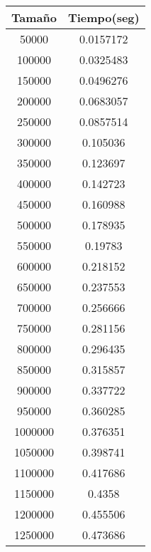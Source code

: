 \begin{longtable}{|c|c|}
\hline
\textbf{Tamaño}  & \textbf{Tiempo(seg)} \\ \hline
50000   & 0.0157172   \\ \hline
100000  & 0.0325483   \\ \hline
150000  & 0.0496276   \\ \hline
200000  & 0.0683057   \\ \hline
250000  & 0.0857514   \\ \hline
300000  & 0.105036    \\ \hline
350000  & 0.123697    \\ \hline
400000  & 0.142723    \\ \hline
450000  & 0.160988    \\ \hline
500000  & 0.178935    \\ \hline
550000  & 0.19783     \\ \hline
600000  & 0.218152    \\ \hline
650000  & 0.237553    \\ \hline
700000  & 0.256666    \\ \hline
750000  & 0.281156    \\ \hline
800000  & 0.296435    \\ \hline
850000  & 0.315857    \\ \hline
900000  & 0.337722    \\ \hline
950000  & 0.360285    \\ \hline
1000000 & 0.376351    \\ \hline
1050000 & 0.398741    \\ \hline
1100000 & 0.417686    \\ \hline
1150000 & 0.4358      \\ \hline
1200000 & 0.455506    \\ \hline
1250000 & 0.473686    \\ \hline
\end{longtable}
